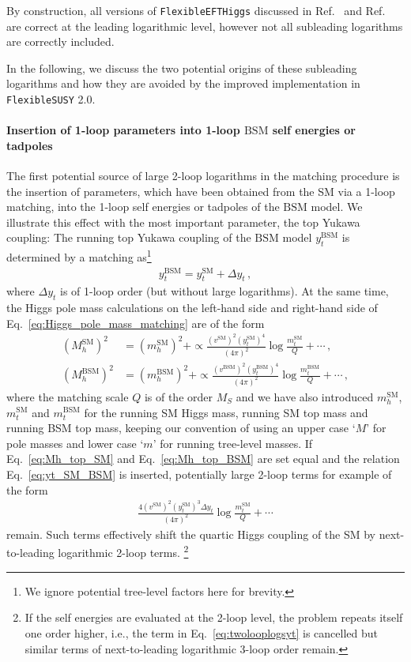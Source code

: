 \documentclass[final,3p,11pt,pdflatex]{elsarticle}
\makeatletter
\newcommand{\fs}{\texttt{FlexibleSUSY}\@\xspace}
\newcommand{\fstwo}{\fs 2.0\@\xspace}
\newcommand{\feft}{\texttt{Flex\-ib\-le\-EFT\-Higgs}\@\xspace}
\newcommand{\SM}{\ensuremath{\text{SM}}\xspace}
\newcommand{\BSM}{\ensuremath{\text{BSM}}\xspace}
\newcommand{\MS}{\ensuremath{M_S}\xspace}
\makeatother
\begin{document}
By construction, all versions of \feft discussed in
Ref.~\cite{Athron:2016fuq} and Ref.~\cite{Staub:2017jnp} are correct at the
leading logarithmic level, however not all subleading logarithms are correctly
included.
%

In the following, we discuss the two potential origins of these subleading
logarithms and how they are avoided by the improved  implementation in
\fstwo.

\paragraph{Insertion of 1-loop parameters into 1-loop \BSM self energies or
  tadpoles}

The first potential source of large 2-loop logarithms in the matching
procedure is the insertion of parameters, which have been obtained from the SM
via a 1-loop matching, into the 1-loop self energies or tadpoles of the \BSM
model.  We illustrate this effect with the most important parameter, the top
Yukawa coupling:
The running top Yukawa coupling of the \BSM model  $y_t^\BSM$ is
determined by a matching as\footnote{We ignore potential tree-level
  factors here for brevity.}
%
\begin{align}
  y_t^\BSM = y_t^\SM + \Delta y_t \,, \label{eq:yt_SM_BSM}
\end{align}
%
where $\Delta y_t$ is of 1-loop order (but without large logarithms).
At the same time, the Higgs pole mass calculations on the left-hand side and
right-hand side of Eq.~\eqref{eq:Higgs_pole_mass_matching} are of the form
%
\begin{align}
  (M_h^\SM)^2 &= (m_h^\SM)^2 + \propto \frac{(v^\SM)^2(y_t^\SM)^4}{(4\pi)^2} \log\frac{m_t^\SM}{Q} + \cdots \,,
  \label{eq:Mh_top_SM}\\
  (M_h^\BSM)^2 &= (m_h^\BSM)^2 + \propto \frac{(v^\BSM)^2(y_t^\BSM)^4}{(4\pi)^2} \log\frac{m_t^\BSM}{Q} + \cdots \,,
  \label{eq:Mh_top_BSM}
\end{align}
%
where the matching scale $Q$ is of the order $\MS$ and we have also
introduced $m_h^\SM$, $m_t^\SM$ and $m_t^\BSM$ for the running SM
Higgs mass, running SM top mass and running BSM top mass,
keeping our convention of using an upper case `$M$' for pole masses
and lower case `$m$' for running tree-level masses.  If
Eq.\ \eqref{eq:Mh_top_SM} and Eq.\ \eqref{eq:Mh_top_BSM} are set equal
and the relation Eq.\ \eqref{eq:yt_SM_BSM} is inserted, potentially
large 2-loop terms for example of the form
%
\begin{align}
  \frac{4(v^\SM)^2(y_t^\SM)^3 \Delta y_t}{(4\pi)^2} \log\frac{m_t^\SM}{Q} + \cdots
\label{eq:twolooplogsyt}
\end{align}
%
remain. Such terms effectively shift the quartic Higgs coupling of the
SM by  next-to-leading logarithmic 2-loop terms.%
\footnote{If the self energies are evaluated at the
  2-loop level, the problem repeats itself one order higher, i.e., the
  term in Eq.~\eqref{eq:twolooplogsyt} is cancelled but similar terms of
  next-to-leading logarithmic 3-loop order remain.}
\end{document}
